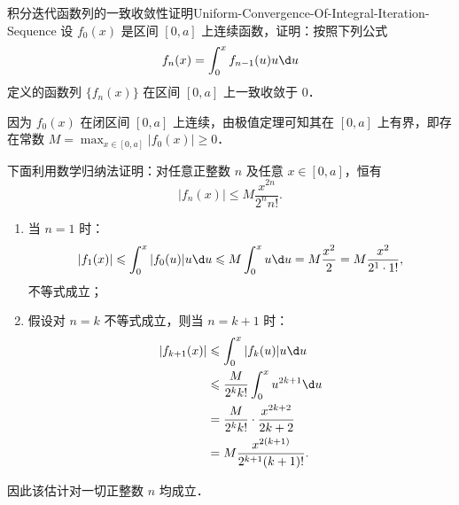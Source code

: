 \begin{problem}{积分迭代函数列的一致收敛性证明}{Uniform-Convergence-Of-Integral-Iteration-Sequence}
    设 $f_0(x)$ 是区间 $[0, a]$ 上连续函数，证明：按照下列公式
    \begin{equation}
        f_n(x) = \int_0^x f_{n-1}(u) u \d u
    \end{equation}
    定义的函数列 $\{f_n(x)\}$ 在区间 $[0, a]$ 上一致收敛于 $0$．
\end{problem}

\begin{myproof}
    因为 $f_0(x)$ 在闭区间 $[0, a]$ 上连续，由极值定理可知其在 $[0, a]$ 上有界，即存在常数 $M = \max_{x \in [0, a]} |f_0(x)| \geqslant 0$．

    下面利用数学归纳法证明：对任意正整数 $n$ 及任意 $x \in [0, a]$，恒有
    \begin{equation}
        |f_n(x)| \leqslant M \frac{x^{2n}}{2^n n!}.
    \end{equation}
    \begin{enumerate}
        \item 当 $n = 1$ 时：
              \begin{equation}
                  |f_1(x)| \leqslant \int_0^x |f_0(u)| u \d u \leqslant M \int_0^x u \d u = M \frac{x^2}{2} = M \frac{x^2}{2^1 \cdot 1!},
              \end{equation}
              不等式成立；
        \item 假设对 $n = k$ 不等式成立，则当 $n = k + 1$ 时：
              \begin{equation}
                  \begin{aligned}
                      |f_{k+1}(x)| & \leqslant \int_0^x |f_k(u)| u \d u               \\
                                   & \leqslant \frac{M}{2^k k!} \int_0^x u^{2k+1}\d u \\
                                   & = \frac{M}{2^k k!} \cdot \frac{x^{2k+2}}{2k + 2} \\
                                   & = M \frac{x^{2(k+1)}}{2^{k+1}(k + 1)!}.
                  \end{aligned}
              \end{equation}
    \end{enumerate}
    因此该估计对一切正整数 $n$ 均成立．


\end{myproof}
